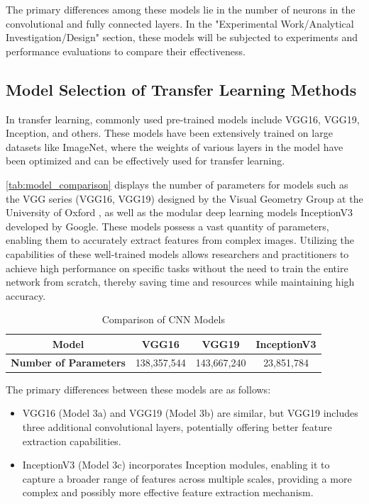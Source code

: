 The primary differences among these models lie in the number of neurons in the convolutional and fully connected layers. In the "Experimental Work/Analytical Investigation/Design" section, these models will be subjected to experiments and performance evaluations to compare their effectiveness.

\subsection{Model Selection of Transfer Learning Methods}
In transfer learning, commonly used pre-trained models include VGG16, VGG19, Inception, and others. These models have been extensively trained on large datasets like ImageNet, where the weights of various layers in the model have been optimized and can be effectively used for transfer learning\cite{4.30 7}.

\autoref{tab:model_comparison} displays the number of parameters for models such as the VGG series (VGG16, VGG19) designed by the Visual Geometry Group at the University of Oxford \cite{DL.5}, as well as the modular deep learning models InceptionV3 \cite{DL.6}\cite{DL.7} developed by Google. These models possess a vast quantity of parameters, enabling them to accurately extract features from complex images. Utilizing the capabilities of these well-trained models allows researchers and practitioners to achieve high performance on specific tasks without the need to train the entire network from scratch, thereby saving time and resources while maintaining high accuracy\cite{4.30 8}.

\begin{table}[H]
    \centering
    \caption{Comparison of CNN Models}
    \label{tab:model_comparison}
    \begin{tabular}{cccc}
        \toprule
        \textbf{Model} & \textbf{VGG16} & \textbf{VGG19} & \textbf{InceptionV3}\\
        \midrule
        \textbf{Number of Parameters} & 138,357,544 & 143,667,240 & 23,851,784 \\
        \bottomrule
    \end{tabular}
\end{table}

The primary differences between these models are as follows:

\begin{itemize}
\item VGG16 (Model 3a) and VGG19 (Model 3b) are similar, but VGG19 includes three additional convolutional layers, potentially offering better feature extraction capabilities.
\item InceptionV3 (Model 3c) incorporates Inception modules, enabling it to capture a broader range of features across multiple scales, providing a more complex and possibly more effective feature extraction mechanism.
\end{itemize}

